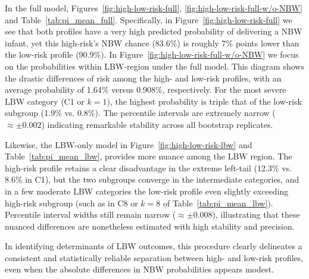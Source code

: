 In the full model, Figures~\ref{fig:high-low-risk-full}, \ref{fig:high-low-risk-full-w/o-NBW} and Table~\ref{tab:pi_mean_full}. Specifically, in Figure~\ref{fig:high-low-risk-full} we see that both profiles have a very high predicted probability of delivering a NBW infant, yet this high-risk’s NBW chance (83.6\%) is roughly 7\% points lower than the low-risk profile (90.9\%). In Figure~\ref{fig:high-low-risk-full-w/o-NBW} we focus on the probabilities within LBW-region under the full model. This diagram shows the drastic differences of risk among the high- and low-risk profiles, with an average probability of 1.64\% versus 0.908\%, respectively. For the most severe LBW category (C1 or \(k=1\)), the highest probability is triple that of the low-risk subgroup (1.9\% vs. 0.8\%). The percentile intervals are extremely narrow (\(\approx \pm 0.002\)) indicating remarkable stability across all bootstrap replicates. 

Likewise, the LBW-only model in Figure~\ref{fig:high-low-risk-lbw} and Table~\ref{tab:pi_mean_lbw}, provides more nuance among the LBW region. The high-risk profile retains a clear disadvantage in the extreme left-tail (12.3\% vs. 8.6\% in C1), but the two subgroups converge in the intermediate categories, and in a few moderate LBW categories the low-risk profile even slightly exceeding high-risk subgroup (such as in C8 or \(k=8\) of Table~\ref{tab:pi_mean_lbw}). Percentile interval widths still remain narrow (\(\approx \pm 0.008\)), illustrating that these nuanced differences are nonetheless estimated with high stability and precision. 

In identifying determinants of LBW outcomes, this procedure clearly delineates a consistent and statistically reliable separation between high- and low-risk profiles, even when the absolute differences in NBW probabilities appears modest.
